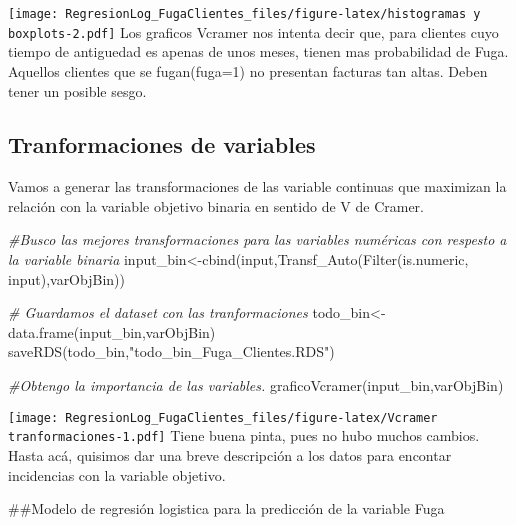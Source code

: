 \documentclass[
]{article}
\newenvironment{Shaded}{\begin{snugshade}}{\end{snugshade}}
\newcommand{\CommentTok}[1]{\textcolor[rgb]{0.56,0.35,0.01}{\textit{#1}}}
\newcommand{\FunctionTok}[1]{\textcolor[rgb]{0.00,0.00,0.00}{#1}}
\newcommand{\NormalTok}[1]{#1}
\newcommand{\OtherTok}[1]{\textcolor[rgb]{0.56,0.35,0.01}{#1}}
\newcommand{\SpecialCharTok}[1]{\textcolor[rgb]{0.00,0.00,0.00}{#1}}
\newcommand{\StringTok}[1]{\textcolor[rgb]{0.31,0.60,0.02}{#1}}
\begin{document}
\texttt{[image: RegresionLog\_FugaClientes\_files/figure-latex/histogramas y boxplots-2.pdf]}
Los graficos Vcramer nos intenta decir que, para clientes cuyo tiempo de
antiguedad es apenas de unos meses, tienen mas probabilidad de Fuga.
Aquellos clientes que se fugan(fuga=1) no presentan facturas tan altas.
Deben tener un posible sesgo.

\hypertarget{tranformaciones-de-variables}{%
\subsection{Tranformaciones de
variables}\label{tranformaciones-de-variables}}

Vamos a generar las transformaciones de las variable continuas que
maximizan la relación con la variable objetivo binaria en sentido de V
de Cramer.

\begin{Shaded}
\begin{Highlighting}[]
\CommentTok{\#Busco las mejores transformaciones para las variables numéricas con respesto a la variable binaria}
\NormalTok{input\_bin}\OtherTok{\textless{}{-}}\FunctionTok{cbind}\NormalTok{(input,}\FunctionTok{Transf\_Auto}\NormalTok{(}\FunctionTok{Filter}\NormalTok{(is.numeric, input),varObjBin))}

\CommentTok{\# Guardamos el dataset con las tranformaciones}
\NormalTok{todo\_bin}\OtherTok{\textless{}{-}}\FunctionTok{data.frame}\NormalTok{(input\_bin,varObjBin)}
\FunctionTok{saveRDS}\NormalTok{(todo\_bin,}\StringTok{"todo\_bin\_Fuga\_Clientes.RDS"}\NormalTok{)}
\end{Highlighting}
\end{Shaded}

\begin{Shaded}
\begin{Highlighting}[]
\CommentTok{\#Obtengo la importancia de las variables. }
\FunctionTok{graficoVcramer}\NormalTok{(input\_bin,varObjBin)}
\end{Highlighting}
\end{Shaded}

\texttt{[image: RegresionLog\_FugaClientes\_files/figure-latex/Vcramer tranformaciones-1.pdf]}
Tiene buena pinta, pues no hubo muchos cambios. Hasta acá, quisimos dar
una breve descripción a los datos para encontar incidencias con la
variable objetivo.

\#\#Modelo de regresión logistica para la predicción de la variable Fuga

\begin{Shaded}
\end{Shaded}
\end{document}
